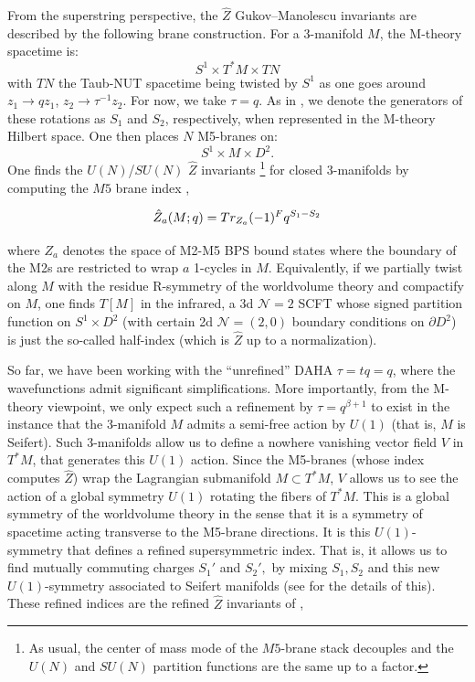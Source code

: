 \documentclass{article}
\renewcommand{\d}{\partial}
\def\be{\begin{equation}}
\def\ee{\end{equation}}
\numberwithin{corollary}{theorem}
\numberwithin{corollary}{proposition}
\begin{document}
From the superstring perspective, the $\hat{Z}$ Gukov--Manolescu invariants are described by the following brane construction. For a 3-manifold $M$, the M-theory spacetime is:
$$    S^1 \times T^*M \times TN$$
with $TN$ the Taub-NUT spacetime being twisted by $S^1$ as one goes around $z_1\rightarrow q z_1$, $z_2 \rightarrow \tau^{-1} z_2$. For now, we take $\tau=q$. As in \cite{AS}, we denote the generators of these rotations as $S_1$ and $S_2$, respectively, when represented in the M-theory Hilbert space. One then places $N$ M5-branes on:
$$S^1 \times M \times D^2.$$
One finds the $U(N)$/$SU(N)$ $\hat{Z}$ invariants \footnote{As usual, the center of mass mode of the $M5$-brane stack decouples and the $U(N)$ and $SU(N)$ partition functions are the same up to a factor.} for closed 3-manifolds by computing the $M5$ brane index \cite{GPPV},

\be \Hat{Z}_a(M;q) = Tr_{Z_a} (-1)^F q^{S_1 - S_2}\ee 

where $Z_a$ denotes the space of M2-M5 BPS bound states where the boundary of the M2s are restricted to wrap $a$ 1-cycles in $M$. Equivalently, if we partially twist along $M$ with the residue R-symmetry of the worldvolume theory and compactify on $M$, one finds $T[M]$ in the infrared, a 3d $\mathcal{N}=2$ SCFT whose signed partition function on $S^1\times D^2$ (with certain 2d $\mathcal{N}= (2,0)$ boundary conditions on $\d D^2$) is just the so-called half-index (which is $\hat{Z}$ up to a normalization).

So far, we have been working with the ``unrefined'' DAHA $\tau = t q = q$, where the wavefunctions admit significant simplifications. More importantly, from the M-theory viewpoint, we only expect such a refinement by $\tau = q^{\beta+1}$ to exist in the instance that the 3-manifold $M$ admits a semi-free action by $U(1)$ (that is, $M$ is Seifert). Such 3-manifolds allow us to define a nowhere vanishing vector field $V$ in $T^*M$, that generates this $U(1)$ action. Since the M5-branes (whose index computes $\hat{Z}$) wrap the Lagrangian submanifold $M\subset T^* M$, $V$ allows us to see the action of a global symmetry $U(1)$ rotating the fibers of $T^* M$. This is a global symmetry of the worldvolume theory in the sense that it is a symmetry of spacetime acting transverse to the M5-brane directions.  It is this $U(1)$-symmetry that defines a refined supersymmetric index. That is, it allows us to find mutually commuting charges $S_1'$ and $S_2',$ by mixing $S_1,S_2$ and this new $U(1)$-symmetry associated to Seifert manifolds (see \cite{AS} for the details of this). These refined indices are the refined $\hat{Z}$ invariants of \cite{GPPV},
\end{document}
